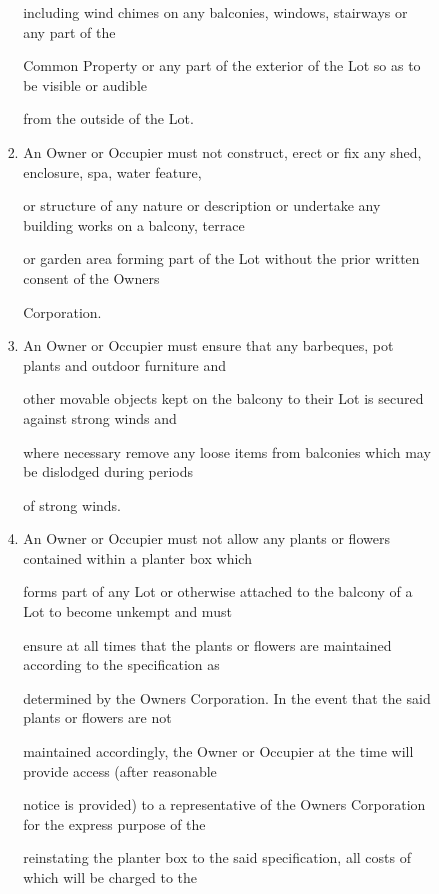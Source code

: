 \documentclass{article}
\begin{document}
\begin{enumerate}[label=\arabic*.]
\begin{enumerate}[label=\arabic{enumi}.\arabic*.]
\begin{enumerate}[label=(\arabic*)]
\begin{enumerate}[label=(\alph*)]
{\fontsize{10.02}{1}including wind chimes on any balconies, windows, stairways or any part of the  }

{\fontsize{10.02}{1}Common Property or any part of the exterior of the Lot so as to be visible or audible }

{\fontsize{10.02}{1}from the outside of the Lot. }

\item {\fontsize{9.962}{1} An Owner or Occupier must not construct, erect or fix any shed, enclosure, spa, water feature, }

{\fontsize{10.02}{1}or structure of any nature or description or undertake any building works on a balcony, terrace }

{\fontsize{10.02}{1}or garden area forming part of the Lot without the prior written consent of the Owners }

{\fontsize{10.02}{1}Corporation. }

\item {\fontsize{9.962}{1} An Owner or Occupier must ensure that any barbeques, pot plants and outdoor furniture and }

{\fontsize{10.02}{1}other movable objects kept on the balcony to their Lot is secured against strong winds and }

{\fontsize{10.02}{1}where necessary remove any loose items from balconies which may be dislodged during periods }

{\fontsize{10.02}{1}of strong winds. }

\item {\fontsize{9.962}{1} An Owner or Occupier must not allow any plants or flowers contained within a planter box which }

{\fontsize{10.02}{1}forms part of any Lot or otherwise attached to the balcony of a Lot to become unkempt and must }

{\fontsize{10.02}{1}ensure at all times that the plants or flowers are maintained according to the specification as }

{\fontsize{10.02}{1}determined by the Owners Corporation. In the event that the said plants or flowers are not }

{\fontsize{10.02}{1}maintained accordingly, the Owner or Occupier at the time will provide access (after reasonable }

{\fontsize{10.02}{1}notice is provided) to a representative of the Owners Corporation for the express purpose of the }

{\fontsize{10.02}{1}reinstating the planter box to the said specification, all costs of which will be charged to the }


\end{enumerate}
\end{enumerate}
\end{enumerate}
\end{enumerate}
\end{document}
